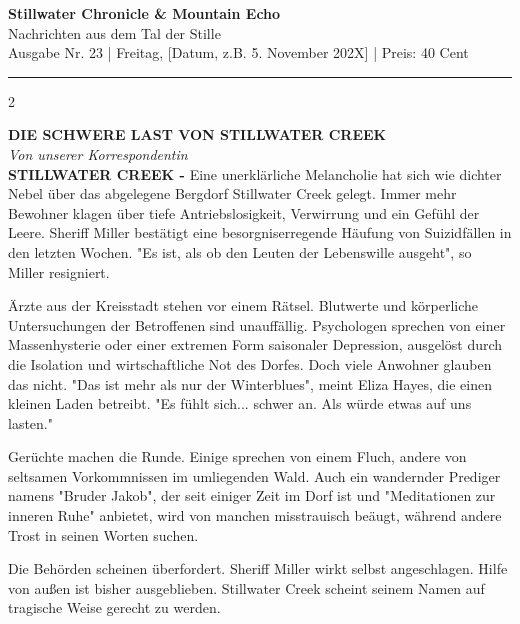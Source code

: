 \documentclass[10pt, a4paper]{article}
\begin{document}
\frenchspacing
\begin{center}
    \fontsize{30}{36}\selectfont \textbf{Stillwater Chronicle & Mountain Echo} \\
    \large Nachrichten aus dem Tal der Stille \\
    \normalsize Ausgabe Nr. 23 \quad | \quad Freitag, [Datum, z.B. 5. November 202X] \quad | \quad Preis: 40 Cent %
\end{center}
\vspace{0.5em}
\rule{\linewidth}{1pt}
\vspace{1em}

\begin{multicols}{2} %

\large \textbf{DIE SCHWERE LAST VON STILLWATER CREEK} \normalsize \\
\small \textit{Von unserer Korrespondentin} \normalsize \\

\textbf{STILLWATER CREEK -} Eine unerklärliche Melancholie hat sich wie dichter Nebel über das abgelegene Bergdorf Stillwater Creek gelegt. Immer mehr Bewohner klagen über tiefe Antriebslosigkeit, Verwirrung und ein Gefühl der Leere. Sheriff Miller bestätigt eine besorgniserregende Häufung von Suizidfällen in den letzten Wochen. "Es ist, als ob den Leuten der Lebenswille ausgeht", so Miller resigniert.

Ärzte aus der Kreisstadt stehen vor einem Rätsel. Blutwerte und körperliche Untersuchungen der Betroffenen sind unauffällig. Psychologen sprechen von einer Massenhysterie oder einer extremen Form saisonaler Depression, ausgelöst durch die Isolation und wirtschaftliche Not des Dorfes. Doch viele Anwohner glauben das nicht. "Das ist mehr als nur der Winterblues", meint Eliza Hayes, die einen kleinen Laden betreibt. "Es fühlt sich... schwer an. Als würde etwas auf uns lasten."

Gerüchte machen die Runde. Einige sprechen von einem Fluch, andere von seltsamen Vorkommnissen im umliegenden Wald. Auch ein wandernder Prediger namens "Bruder Jakob", der seit einiger Zeit im Dorf ist und "Meditationen zur inneren Ruhe" anbietet, wird von manchen misstrauisch beäugt, während andere Trost in seinen Worten suchen.

Die Behörden scheinen überfordert. Sheriff Miller wirkt selbst angeschlagen. Hilfe von außen ist bisher ausgeblieben. Stillwater Creek scheint seinem Namen auf tragische Weise gerecht zu werden.


\end{multicols}
\end{document}
